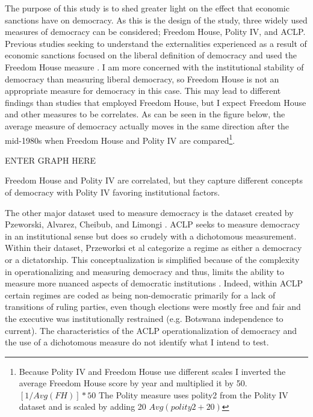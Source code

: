 \documentclass[a4paper]{article}\usepackage[]{graphicx}\usepackage[]{color}
\begin{document}
\par
The purpose of this study is to shed greater light on the effect that economic sanctions have on democracy. As this is the design of the study, three widely used measures of democracy can be considered; Freedom House, Polity IV, and ACLP.  Previous studies seeking to understand the externalities experienced as a result of economic sanctions focused on the liberal definition of democracy and used the Freedom House measure \cite{lopez1997economic, peksen2009better, peksen2009economic, peksen2010coercive, pdeksen2010coercive, wood2008hand}. I am more concerned with the institutional stability of democracy than measuring liberal democracy, so Freedom House is not an appropriate measure for democracy in this case. This may lead to different findings than studies that employed Freedom House, but I expect Freedom House and other measures to be correlates. As can be seen in the figure below, the average measure of democracy actually moves in the same direction after the mid-1980s when Freedom House and Polity IV are compared\footnote{Because Polity IV and Freedom House use different scales I inverted the average Freedom House score by year and multiplied it by 50. $[1/Avg(FH)]*50$ The Polity measure uses polity2 from the Polity IV dataset and is scaled by adding 20 $Avg(polity2 +20)$}.   
\par
ENTER GRAPH HERE
\par
Freedom House and Polity IV are correlated, but they capture different concepts of democracy with Polity IV favoring institutional factors. 
\par
The other major dataset used to measure democracy is the dataset created by Pzeworski, Alvarez, Cheibub, and Limongi \citet[Henceforth \textbf{ACLP}]{przeworski2000democracy}. ACLP seeks to measure democracy in an institutional sense but does so crudely with a dichotomous measurement. Within their dataset, Przeworksi et al categorize a regime as either a democracy or a dictatorship. This conceptualization is simplified because of the complexity in operationalizing and measuring democracy and thus, limits the ability to measure more nuanced aspects of democratic institutions \citep{bogaards2012draw}. Indeed, within ACLP certain regimes are coded as being non-democratic primarily for a lack of transitions of ruling parties, even though elections were mostly free and fair and the executive was institutionally restrained (e.g. Botswana independence to current). The characteristics of the ACLP operationalization of democracy and the use of a dichotomous measure do not identify what I intend to test.  
\end{document}
